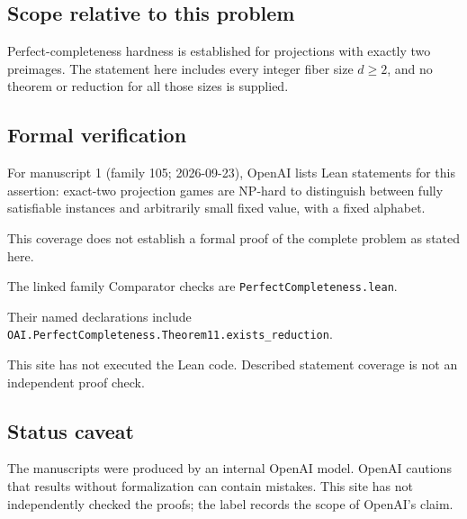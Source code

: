 \documentclass[11pt]{article}
\begin{document}
\subsection{Scope relative to this problem}
Perfect-completeness hardness is established for projections with exactly two preimages. The statement here includes every integer fiber size $d\ge2$, and no theorem or reduction for all those sizes is supplied.

\subsection{Formal verification}
For manuscript 1 (family 105; 2026-09-23), OpenAI lists Lean statements for this assertion: exact-two projection games are NP-hard to distinguish between fully satisfiable instances and arbitrarily small fixed value, with a fixed alphabet.

This coverage does not establish a formal proof of the complete problem as stated here.

The linked family Comparator checks are \texttt{PerfectCompleteness.lean}.

Their named declarations include \texttt{OAI.PerfectCompleteness.Theorem11.exists\_reduction}.

This site has not executed the Lean code. Described statement coverage is not an independent proof check.

\subsection{Status caveat}
The manuscripts were produced by an internal OpenAI model. OpenAI cautions that results without formalization can contain mistakes. This site has not independently checked the proofs; the label records the scope of OpenAI's claim.
\end{document}
